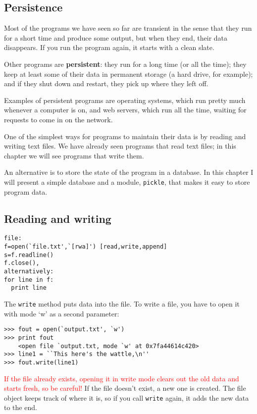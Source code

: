 \documentclass{article}
\begin{document}
\subsection{Persistence}
Most of the programs we have seen so far are transient in the sense
that they run for a short time and produce some output, but when they
end, their data disappears. If you run the program again, it starts
with a clean slate.
\par Other programs are \textbf{persistent}: they run for a long time
(or all the time);
they keep at least some of their data in permanent storage (a
hard drive, for example); and if they shut down and restart, they pick
up where they left off.
\par Examples of persistent programs are operating systems, which run
pretty much whenever a computer is on, and web servers, which run all
the time, waiting for requests to come in on the network.
\par One of the simplest ways for programs to maintain their data is by
reading and writing text files. We have already seen programs that
read text files; in this chapter we will see programs that write them.
\par An alternative is to store the state of the program in a database. In
this chapter I will present a simple database and a module,
\verb|pickle|,
that makes it easy to store program data.

\subsection{Reading and writing}

\begin{verbatim}
file:
f=open(`file.txt',`[rwa]') [read,write,append]
s=f.readline()
f.close(),
alternatively:
for line in f:
  print line
\end{verbatim}
\par The \verb|write| method puts data into the file.
To write a file, you have to open it with mode `w' as a second parameter:

\begin{verbatim}
>>> fout = open(`output.txt', `w')
>>> print fout
    <open file `output.txt, mode `w' at 0x7fa44614c420>
>>> line1 = ``This here's the wattle,\n''
>>> fout.write(line1)
\end{verbatim}

\par \textcolor{red}{If the file already exists, opening it in
write mode clears out the
old data and starts fresh, so be careful!} If the file doesn't
exist, a new one is created.
The file object keeps track of where it is, so if you call
\verb|write| again, it adds the new data to the end.
\end{document}
